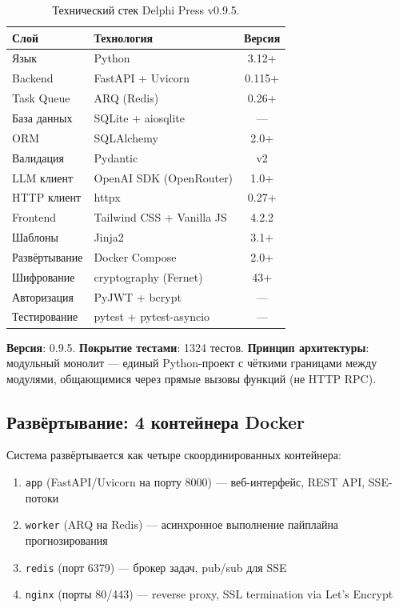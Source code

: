 \begin{table}[h]
\centering
\small
\begin{tabular}{|l|l|c|}
\hline
\textbf{Слой} & \textbf{Технология} & \textbf{Версия} \\
\hline
Язык & Python & 3.12+ \\
Backend & FastAPI + Uvicorn & 0.115+ \\
Task Queue & ARQ (Redis) & 0.26+ \\
База данных & SQLite + aiosqlite & — \\
ORM & SQLAlchemy & 2.0+ \\
Валидация & Pydantic & v2 \\
LLM клиент & OpenAI SDK (OpenRouter) & 1.0+ \\
HTTP клиент & httpx & 0.27+ \\
Frontend & Tailwind CSS + Vanilla JS & 4.2.2 \\
Шаблоны & Jinja2 & 3.1+ \\
Развёртывание & Docker Compose & 2.0+ \\
Шифрование & cryptography (Fernet) & 43+ \\
Авторизация & PyJWT + bcrypt & — \\
Тестирование & pytest + pytest-asyncio & — \\
\hline
\end{tabular}
\caption{Технический стек Delphi Press v0.9.5.}
\label{tab:tech_stack}
\end{table}


\textbf{Версия}: 0.9.5. \textbf{Покрытие тестами}: 1324 тестов. \textbf{Принцип архитектуры}: модульный монолит — единый Python-проект с чёткими границами между модулями, общающимися через прямые вызовы функций (не HTTP RPC).

\subsection{Развёртывание: 4 контейнера Docker}

Система развёртывается как четыре скоординированных контейнера:

\begin{enumerate}[nosep]
\item \texttt{app} (FastAPI/Uvicorn на порту 8000) — веб-интерфейс, REST API, SSE-потоки
\item \texttt{worker} (ARQ на Redis) — асинхронное выполнение пайплайна прогнозирования
\item \texttt{redis} (порт 6379) — брокер задач, pub/sub для SSE
\item \texttt{nginx} (порты 80/443) — reverse proxy, SSL termination via Let's Encrypt
\end{enumerate}

